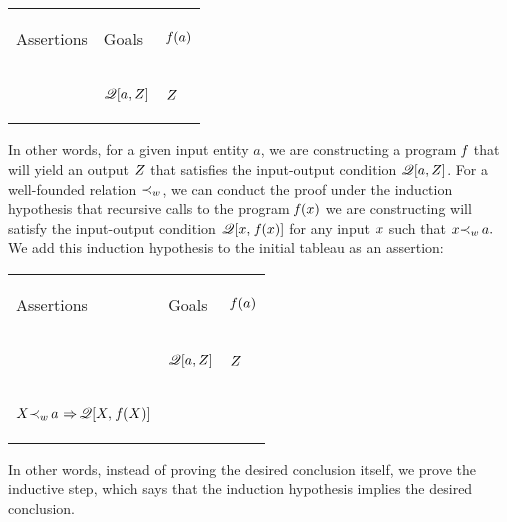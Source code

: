 \documentclass[runningheads]{llncs}
\DeclareMathOperator{\uf}{\emph{f}\,}
\DeclareMathOperator{\uimplies}{\Rightarrow}
\begin{document}
    
   \begin{center}
\begin{tabular}{T}
 \hline
 \begin{center} Assertions\end{center} &
 \begin{center} Goals\end{center}
 &\begin{center} $\uf(a)$ \end{center}\\ 
 \hhline{|=|=|=|} 
 &\begin{center} $ \mathscr{Q}[a,  Z] $ \end{center}& \begin{center}$Z$ \end{center}\\ 
 
 \hline
\end{tabular}
\end{center}
\noindent In other words, for a given input entity $a$, we are constructing a program $\uf$ that will yield an output $Z$ that satisfies the input-output condition $ \mathscr{Q}[a, Z] $. For a well-founded relation ${\prec}_{w}$, we can conduct the proof under the induction hypothesis that recursive calls to the program $\uf(\var{x})$ we are constructing will satisfy the input-output condition $ \mathscr{Q}[\var{x}, \, \uf(\var{x})]$ for any input $x$ such that $x{\prec}_{w} \, a.$  We add this induction hypothesis to the initial tableau as an assertion: 


      \begin{center}
\begin{tabular}{T}
 \hline
 \begin{center} Assertions \end{center} 
 & \begin{center} Goals \end{center}
 &\begin{center} $\uf(a)$ \end{center}\\ \hhline{|=|=|=|}
 & \begin{center} $ \mathscr{Q}[a,  Z] $ \end{center}
 & \begin{center} $Z$ \end{center} \\ 
 \hline 
 \begin{center} $ \var{X} \expsub{\prec}{w}\,a   \, \uimplies \mathscr{Q}[\var{X},\, \uf(\var{X})]$ \end{center} &  &  \\ 
 \hline
\end{tabular}
\end{center}
In other words, instead of proving the desired conclusion itself, we prove the inductive step, which says that the induction hypothesis implies the desired conclusion. 
\end{document}
